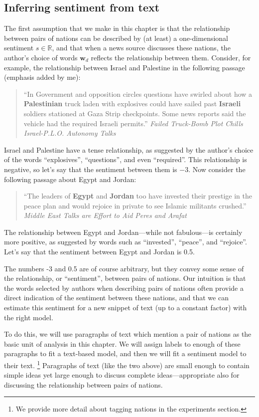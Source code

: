 \subsection{Inferring sentiment from text}
\label{sec:text_regression}
The first assumption that we make in this chapter is that the
relationship between pairs of nations can be described by (at least) a
one-dimensional sentiment $s \in \mathbb{R}$, and that when a news
source discusses these nations, the author's choice of words $\bm
w_d$ reflects the relationship between them.
Consider, for example, the relationship between Israel and Palestine
in the following passage (emphasis added by me):
\begin{quote} ``In Government and opposition circles
  questions have swirled about how a \textbf{Palestinian} truck laden with
  explosives could have sailed past \textbf{Israeli} soldiers stationed at
  Gaza Strip checkpoints.  Some news reports said the vehicle had
  the required Israeli permits.'' \emph{Failed Truck-Bomb Plot Chills
    Israel-P.L.O. Autonomy Talks} \citep{nyt_haberman:1995}
\end{quote}
Israel and Palestine have a tense relationship, as suggested by the
author's choice of the words ``explosives'', ``questions'', and even
``required''.  This relationship is negative, so let's say that the
sentiment between them is $-3$. Now consider the
following passage about Egypt and Jordan:
\begin{quote} ``The leaders of \textbf{Egypt} and
  \textbf{Jordan} too have invested their prestige in the peace plan
  and would rejoice in private to see Islamic militants crushed.''
  \emph{Middle East Talks are Effort to Aid Peres and Arafat}
  \citep{nyt_jehl:1996}
\end{quote}
The relationship between Egypt and Jordan---while not fabulous---is
certainly more positive, as suggested by words such as ``invested'',
``peace'', and ``rejoice''.  Let's say that the sentiment between
Egypt and Jordan is 0.5.

The numbers -3 and 0.5 are of course arbitrary, but they convey some
sense of the relationship, or ``sentiment'', between pairs of nations.
Our intuition is that the words selected by authors when describing
pairs of nations often provide a direct indication of the sentiment
between these nations, and that we can estimate this sentiment for a
new snippet of text (up to a constant factor) with the right model.

To do this, we will use paragraphs of text which mention a pair of
nations as the basic unit of analysis in this chapter.  We will assign
labels to enough of these paragraphs to fit a text-based model, and
then we will fit a sentiment model to their text. \footnote{We provide
  more detail about tagging nations in the experiments section.}
Paragraphs of text (like the two above) are small enough to contain
simple ideas yet large enough to discuss complete ideas---appropriate
also for discussing the relationship between pairs of nations.

